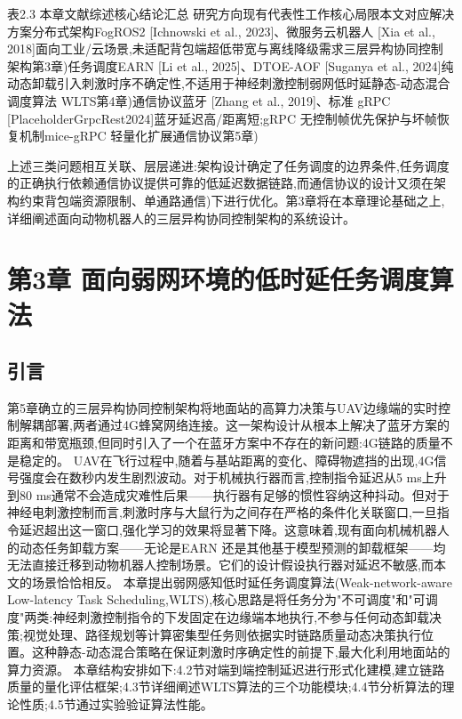表2.3 本章文献综述核心结论汇总
研究方向现有代表性工作核心局限本文对应解决方案分布式架构FogROS2 [Ichnowski et al., 2023]、微服务云机器人 [Xia et al., 2018]面向工业/云场景,未适配背包端超低带宽与离线降级需求三层异构协同控制架构第3章)任务调度EARN [Li et al., 2025]、DTOE-AOF [Suganya et al., 2024]纯动态卸载引入刺激时序不确定性,不适用于神经刺激控制弱网低时延静态-动态混合调度算法 WLTS第4章)通信协议蓝牙 [Zhang et al., 2019]、标准 gRPC [PlaceholderGrpcRest2024]蓝牙延迟高/距离短;gRPC 无控制帧优先保护与坏帧恢复机制mice-gRPC 轻量化扩展通信协议第5章)

上述三类问题相互关联、层层递进:架构设计确定了任务调度的边界条件,任务调度的正确执行依赖通信协议提供可靠的低延迟数据链路,而通信协议的设计又须在架构约束背包端资源限制、单通路通信)下进行优化。第3章将在本章理论基础之上,详细阐述面向动物机器人的三层异构协同控制架构的系统设计。

\chapter{第3章 面向弱网环境的低时延任务调度算法}

\section{引言}

第5章确立的三层异构协同控制架构将地面站的高算力决策与UAV边缘端的实时控制解耦部署,两者通过4G蜂窝网络连接。这一架构设计从根本上解决了蓝牙方案的距离和带宽瓶颈,但同时引入了一个在蓝牙方案中不存在的新问题:4G链路的质量不是稳定的。
UAV在飞行过程中,随着与基站距离的变化、障碍物遮挡的出现,4G信号强度会在数秒内发生剧烈波动。对于机械执行器而言,控制指令延迟从5 ms上升到80 ms通常不会造成灾难性后果——执行器有足够的惯性容纳这种抖动。但对于神经电刺激控制而言,刺激时序与大鼠行为之间存在严格的条件化关联窗口,一旦指令延迟超出这一窗口,强化学习的效果将显著下降。这意味着,现有面向机械机器人的动态任务卸载方案——无论是EARN \cite{li2025earn}还是其他基于模型预测的卸载框架——均无法直接迁移到动物机器人控制场景。它们的设计假设执行器对延迟不敏感,而本文的场景恰恰相反。
本章提出弱网感知低时延任务调度算法(Weak-network-aware Low-latency Task Scheduling,WLTS),核心思路是将任务分为"不可调度"和"可调度"两类:神经刺激控制指令的下发固定在边缘端本地执行,不参与任何动态卸载决策;视觉处理、路径规划等计算密集型任务则依据实时链路质量动态决策执行位置。这种静态-动态混合策略在保证刺激时序确定性的前提下,最大化利用地面站的算力资源。
本章结构安排如下:4.2节对端到端控制延迟进行形式化建模,建立链路质量的量化评估框架;4.3节详细阐述WLTS算法的三个功能模块;4.4节分析算法的理论性质;4.5节通过实验验证算法性能。

